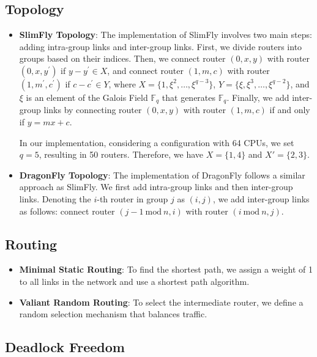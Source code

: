 \documentclass[utf8]{article}
\begin{document}
\subsection{Topology}
\begin{itemize}
    \item \textbf{SlimFly Topology}: The implementation of SlimFly involves two main steps: adding intra-group links and inter-group links. First, we divide routers into groups based on their indices. Then, we connect router \((0,x,y)\) with router \((0,x,y^\prime)\) if \(y-y^\prime \in X\), and connect router \((1,m,c)\) with router \((1,m^\prime,c^\prime)\) if \(c-c^\prime \in Y\), where \(X=\{1,\xi^2, \dots, \xi^{q-3}\}\), \(Y=\{\xi, \xi^3, \dots, \xi^{q-2}\}\), and \(\xi\) is an element of the Galois Field \(\mathbb{F}_q\) that generates \(\mathbb{F}_q\). Finally, we add inter-group links by connecting router \((0,x,y)\) with router \((1,m,c)\) if and only if \(y=mx+c\).

    In our implementation, considering a configuration with 64 CPUs, we set \(q=5\), resulting in 50 routers. Therefore, we have \(X = \{1, 4\}\) and \(X'=\{2, 3\}\).

    \item \textbf{DragonFly Topology}: The implementation of DragonFly follows a similar approach as SlimFly. We first add intra-group links and then inter-group links. Denoting the \(i\)-th router in group \(j\) as \((i,j)\), we add inter-group links as follows: connect router \((j-1 \mathrm{~mod~} n, i)\) with router \((i \mathrm{~mod~} n, j)\).
\end{itemize}

\subsection{Routing}
\begin{itemize}
    \item \textbf{Minimal Static Routing}: To find the shortest path, we assign a weight of 1 to all links in the network and use a shortest path algorithm.
    \item \textbf{Valiant Random Routing}: To select the intermediate router, we define a random selection mechanism that balances traffic.
\end{itemize}

\subsection{Deadlock Freedom}
\end{document}
